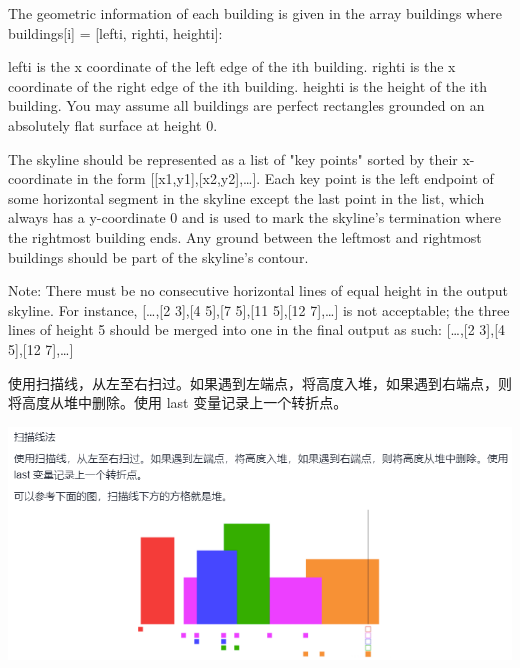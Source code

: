 \documentclass[9pt, b5paaper]{book}
\begin{document}
The geometric information of each building is given in the array buildings where buildings[i] = [lefti, righti, heighti]:

lefti is the x coordinate of the left edge of the ith building.
righti is the x coordinate of the right edge of the ith building.
heighti is the height of the ith building.
You may assume all buildings are perfect rectangles grounded on an absolutely flat surface at height 0.

The skyline should be represented as a list of "key points" sorted by their x-coordinate in the form [[x1,y1],[x2,y2],\ldots{}]. Each key point is the left endpoint of some horizontal segment in the skyline except the last point in the list, which always has a y-coordinate 0 and is used to mark the skyline's termination where the rightmost building ends. Any ground between the leftmost and rightmost buildings should be part of the skyline's contour.

Note: There must be no consecutive horizontal lines of equal height in the output skyline. For instance, [\ldots{},[2 3],[4 5],[7 5],[11 5],[12 7],\ldots{}] is not acceptable; the three lines of height 5 should be merged into one in the final output as such: [\ldots{},[2 3],[4 5],[12 7],\ldots{}]

使用扫描线，从左至右扫过。如果遇到左端点，将高度入堆，如果遇到右端点，则将高度从堆中删除。使用 last 变量记录上一个转折点。

\includegraphics[width=.9\linewidth]{./pic/sweep.png}
\end{document}

